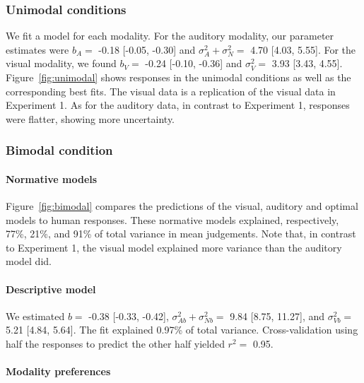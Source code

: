 \documentclass[english,floatsintext,man]{apa6}
\theoremstyle{definition}
\theoremstyle{definition}
\theoremstyle{definition}
\theoremstyle{remark}
\begin{document}
\subsubsection{Unimodal conditions}\label{unimodal-conditions-2}

We fit a model for each modality. For the auditory modality, our
parameter estimates were \(b_A=\) -0.18 {[}-0.05, -0.30{]} and
\(\sigma^2_A+\sigma^2_N=\) 4.70 {[}4.03, 5.55{]}. For the visual
modality, we found \(b_V=\) -0.24 {[}-0.10, -0.36{]} and \(\sigma^2_V=\)
3.93 {[}3.43, 4.55{]}. Figure~\ref{fig:unimodal} shows responses in the
unimodal conditions as well as the corresponding best fits. The visual
data is a replication of the visual data in Experiment 1. As for the
auditory data, in contrast to Experiment 1, responses were flatter,
showing more uncertainty.

\subsubsection{Bimodal condition}\label{bimodal-condition-2}

\paragraph{Normative models}\label{normative-models-1}

Figure~\ref{fig:bimodal} compares the predictions of the visual,
auditory and optimal models to human responses. These normative models
explained, respectively, 77\%, 21\%, and 91\% of total variance in mean
judgements. Note that, in contrast to Experiment 1, the visual model
explained more variance than the auditory model did.

\paragraph{Descriptive model}\label{descriptive-model-1}

We estimated \(b=\) -0.38 {[}-0.33, -0.42{]},
\(\sigma^2_{Ab}+\sigma^2_{Nb}=\) 9.84 {[}8.75, 11.27{]}, and
\(\sigma^2_{Vb}=\) 5.21 {[}4.84, 5.64{]}. The fit explained 0.97\% of
total variance. Cross-validation using half the responses to predict the
other half yielded \(r^2 =\) 0.95.

\paragraph{Modality preferences}\label{modality-preferences}
\end{document}
